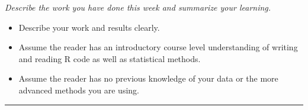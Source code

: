 \documentclass[]{article}
\providecommand{\tightlist}{%
  \setlength{\itemsep}{0pt}\setlength{\parskip}{0pt}}
\begin{document}
\emph{Describe the work you have done this week and summarize your
learning.}

\begin{itemize}
\tightlist
\item
  Describe your work and results clearly.
\item
  Assume the reader has an introductory course level understanding of
  writing and reading R code as well as statistical methods.
\item
  Assume the reader has no previous knowledge of your data or the more
  advanced methods you are using.
\end{itemize}

\begin{center}\rule{0.5\linewidth}{\linethickness}\end{center}
\end{document}
